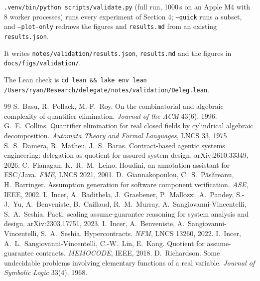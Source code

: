 \documentclass[10pt,a4paper]{article}
\newcommand{\lt}[1]{\texttt{#1}}
\begin{document}
\lt{.venv/bin/python scripts/validate.py} (full run, 1000\,s on an Apple M4 with 8 worker processes) runs every experiment of Section 4; \lt{--quick} runs a subset, and \lt{--plot-only} redraws the figures and \lt{results.md} from an existing \lt{results.json}.

It writes \lt{notes/validation/results.json}, \lt{results.md} and the figures in \lt{docs/figs/validation/}.

The Lean check is \lt{cd lean \&\& lake env lean /Users/ryan/Research/delegate/notes/validation/Deleg.lean}.

\begin{thebibliography}{99}\setlength{\itemsep}{0pt}\setlength{\parskip}{0pt}\scriptsize
{} S.~Basu, R.~Pollack, M.-F.~Roy. On the combinatorial and algebraic complexity of quantifier elimination. \emph{Journal of the ACM} 43(6), 1996.
 G.~E.~Collins. Quantifier elimination for real closed fields by cylindrical algebraic decomposition. \emph{Automata Theory and Formal Languages}, LNCS 33, 1975.
 S.~S.~Damera, R.~Matheu, J.~S.~Baras. Contract-based agentic systems engineering: delegation as quotient for assured system design. arXiv:2610.33349, 2026.
 C.~Flanagan, K.~R.~M.~Leino. Houdini, an annotation assistant for ESC/Java. \emph{FME}, LNCS 2021, 2001.
 D.~Giannakopoulou, C.~S.~P\u{a}s\u{a}reanu, H.~Barringer. Assumption generation for software component verification. \emph{ASE}, IEEE, 2002.
 I.~Incer, A.~Badithela, J.~Graebener, P.~Mallozzi, A.~Pandey, S.-J.~Yu, A.~Benveniste, B.~Caillaud, R.~M.~Murray, A.~Sangiovanni-Vincentelli, S.~A.~Seshia. Pacti: scaling assume-guarantee reasoning for system analysis and design. arXiv:2303.17751, 2023.
 I.~Incer, A.~Benveniste, A.~Sangiovanni-Vincentelli, S.~A.~Seshia. Hypercontracts. \emph{NFM}, LNCS 13260, 2022.
 I.~Incer, A.~L.~Sangiovanni-Vincentelli, C.-W.~Lin, E.~Kang. Quotient for assume-guarantee contracts. \emph{MEMOCODE}, IEEE, 2018.
 D.~Richardson. Some undecidable problems involving elementary functions of a real variable. \emph{Journal of Symbolic Logic} 33(4), 1968.
\end{thebibliography}
\end{document}
